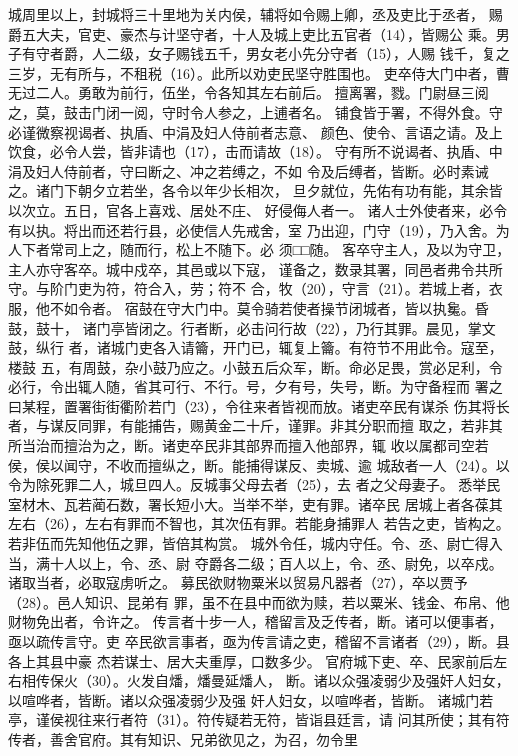 \documentclass[12pt,UTF8]{ctexbook}
\begin{document}
城周里以上，封城将三十里地为关内侯，辅将如令赐上卿，丞及吏比于丞者， 
赐爵五大夫，官吏、豪杰与计坚守者，十人及城上吏比五官者（14），皆赐公 
乘。男子有守者爵，人二级，女子赐钱五千，男女老小先分守者（15），人赐 
钱千，复之三岁，无有所与，不租税（16）。此所以劝吏民坚守胜围也。 
吏卒侍大门中者，曹无过二人。勇敢为前行，伍坐，令各知其左右前后。 
擅离署，戮。门尉昼三阅之，莫，鼓击门闭一阅，守时令人参之，上逋者名。 
铺食皆于署，不得外食。守必谨微察视谒者、执盾、中涓及妇人侍前者志意、 
颜色、使令、言语之请。及上饮食，必令人尝，皆非请也（17），击而请故（18）。 
守有所不说谒者、执盾、中涓及妇人侍前者，守曰断之、冲之若缚之，不如 
令及后缚者，皆断。必时素诫之。诸门下朝夕立若坐，各令以年少长相次， 
旦夕就位，先佑有功有能，其余皆以次立。五日，官各上喜戏、居处不庄、 
好侵侮人者一。 
诸人士外使者来，必令有以执。将出而还若行县，必使信人先戒舍，室 
乃出迎，门守（19），乃入舍。为人下者常司上之，随而行，松上不随下。必 
须□□随。 
客卒守主人，及以为守卫，主人亦守客卒。城中戍卒，其邑或以下寇， 
谨备之，数录其署，同邑者弗令共所守。与阶门吏为符，符合入，劳；符不 
合，牧（20），守言（21）。若城上者，衣服，他不如令者。 
宿鼓在守大门中。莫令骑若使者操节闭城者，皆以执毚。昏鼓，鼓十， 
诸门亭皆闭之。行者断，必击问行故（22），乃行其罪。晨见，掌文鼓，纵行 
者，诸城门吏各入请籥，开门已，辄复上籥。有符节不用此令。寇至，楼鼓 
五，有周鼓，杂小鼓乃应之。小鼓五后众军，断。命必足畏，赏必足利，令 
必行，令出辄人随，省其可行、不行。号，夕有号，失号，断。为守备程而 
署之曰某程，置署街街衢阶若门（23），令往来者皆视而放。诸吏卒民有谋杀 
伤其将长者，与谋反同罪，有能捕告，赐黄金二十斤，谨罪。非其分职而擅 
取之，若非其所当治而擅治为之，断。诸吏卒民非其部界而擅入他部界，辄 
收以属都司空若侯，侯以闻守，不收而擅纵之，断。能捕得谋反、卖城、逾 
城敌者一人（24）。以令为除死罪二人，城旦四人。反城事父母去者（25），去 
者之父母妻子。 
悉举民室材木、瓦若蔺石数，署长短小大。当举不举，吏有罪。诸卒民 
居城上者各葆其左右（26），左右有罪而不智也，其次伍有罪。若能身捕罪人 
若告之吏，皆构之。若非伍而先知他伍之罪，皆倍其构赏。 
城外令任，城内守任。令、丞、尉亡得入当，满十人以上，令、丞、尉 
夺爵各二级；百人以上，令、丞、尉免，以卒戍。诸取当者，必取寇虏听之。 
募民欲财物粟米以贸易凡器者（27），卒以贾予（28）。邑人知识、昆弟有 
罪，虽不在县中而欲为赎，若以粟米、钱金、布帛、他财物免出者，令许之。 
传言者十步一人，稽留言及乏传者，断。诸可以便事者，亟以疏传言守。吏 
卒民欲言事者，亟为传言请之吏，稽留不言诸者（29），断。县各上其县中豪 
杰若谋士、居大夫重厚，口数多少。 
官府城下吏、卒、民家前后左右相传保火（30）。火发自燔，燔曼延燔人， 
断。诸以众强凌弱少及强奸人妇女，以喧哗者，皆断。诸以众强凌弱少及强 
奸人妇女，以喧哗者，皆断。 
诸城门若亭，谨侯视往来行者符（31）。符传疑若无符，皆诣县廷言，请 
问其所使；其有符传者，善舍官府。其有知识、兄弟欲见之，为召，勿令里 
\end{document}
